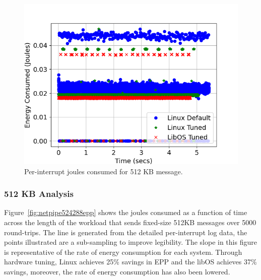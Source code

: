 \begin{figure}[htb]
\begin{minipage}[t]{0.45\textwidth}
	\includegraphics[width=\textwidth]{osdi_figures/netpipe_524288_joule_timeline.png}
	\caption{Per-interrupt joules consumed for 512 KB message.}
	\label{fig:netpipe524288joule}
\end{minipage}
\end{figure}


\subsubsection{512 KB Analysis}
Figure~\ref{fig:netpipe524288epp} shows the joules consumed as a function of time across the length of the workload that sends fixed-size 512KB messages over 5000 round-trips. The line is generated from the detailed per-interrupt log data, the points illustrated are a sub-sampling to improve legibility.  
The slope in this figure is representative of the rate of energy consumption for each system.
Through hardware tuning, Linux achieves 25\% savings in EPP and the libOS achieves 37\% savings, moreover, the rate of energy consumption has also been lowered.



